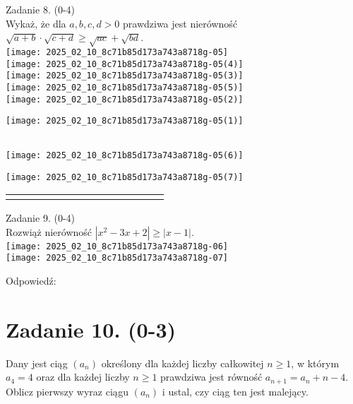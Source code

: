 \documentclass[10pt]{article}
\begin{document}
Zadanie 8. (0-4)\\
Wykaż, że dla \(a, b, c, d>0\) prawdziwa jest nierówność \(\sqrt{a+b} \cdot \sqrt{c+d} \geq \sqrt{a c}+\sqrt{b d}\).\\
\(\qquad\)\\
\texttt{[image: 2025\_02\_10\_8c71b85d173a743a8718g-05]}\\
\(\qquad\)\\
\texttt{[image: 2025\_02\_10\_8c71b85d173a743a8718g-05(4)]}\\
\texttt{[image: 2025\_02\_10\_8c71b85d173a743a8718g-05(3)]}\\
\(\qquad\)\\
\texttt{[image: 2025\_02\_10\_8c71b85d173a743a8718g-05(5)]}\\
\texttt{[image: 2025\_02\_10\_8c71b85d173a743a8718g-05(2)]}\\
\(\qquad\)

\texttt{[image: 2025\_02\_10\_8c71b85d173a743a8718g-05(1)]} \begin{tabular}{|l|l|l|l|l|l|l|l|l|l|l|l|l|}
 &  &  &  &  &  &  &  &  &  &  &  &  \\
\hline
\end{tabular}

\(\qquad\)\\
\texttt{[image: 2025\_02\_10\_8c71b85d173a743a8718g-05(6)]}

\texttt{[image: 2025\_02\_10\_8c71b85d173a743a8718g-05(7)]} \begin{tabular}{|l|l|l|l|l|l|l|l|l|l|l|l|l|l|}
\hline
 &  &  &  &  &  &  &  &  &  &  &  &  &  \\
\hline
 &  &  &  &  &  &  &  &  &  &  &  &  &  \\
\hline
\end{tabular}

Zadanie 9. (0-4)\\
Rozwiąż nierówność \(\left|x^{2}-3 x+2\right| \geq|x-1|\).\\
\texttt{[image: 2025\_02\_10\_8c71b85d173a743a8718g-06]}\\
\texttt{[image: 2025\_02\_10\_8c71b85d173a743a8718g-07]}

Odpowiedź:

\section*{Zadanie 10. (0-3)}
Dany jest ciąg \(\left(a_{n}\right)\) określony dla każdej liczby całkowitej \(n \geq 1\), w którym \(a_{4}=4\) oraz dla każdej liczby \(n \geq 1\) prawdziwa jest równość \(a_{n+1}=a_{n}+n-4\). Oblicz pierwszy wyraz ciągu \(\left(a_{n}\right)\) i ustal, czy ciąg ten jest malejący.
\end{document}

